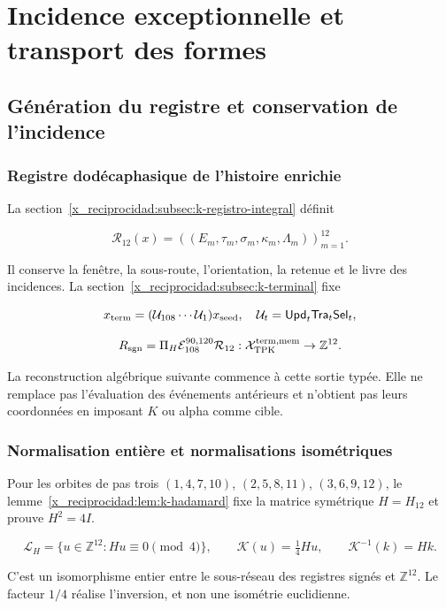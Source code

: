 \chapter{Incidence exceptionnelle et transport des formes}
\label{x_reciprocidad:nuclear:4}
\section{Génération du registre et conservation de l’incidence}

\subsection{Registre dodécaphasique de l’histoire enrichie}

La section~\ref{x_reciprocidad:subsec:k-registro-integral} définit

\[
\mathcal R_{12}(x)=((E_m,\tau_m,\sigma_m,\kappa_m,\Lambda_m))_{m=1}^{12}.
\]

Il conserve la fenêtre, la sous-route, l’orientation, la retenue et le livre des incidences. La section~\ref{x_reciprocidad:subsec:k-terminal} fixe

\[
x_{\rm term}=(\mathcal U_{108}\cdots\mathcal U_1)x_{\rm seed},
\quad \mathcal U_t=\mathsf{Upd}_t\mathsf{Tra}_t\mathsf{Sel}_t,
\]

\[
R_{\rm sgn}=\Pi_H\mathcal E_{108}^{90,120}\mathcal R_{12}:
\mathcal X_{\rm TPK}^{\rm term,mem}\to\mathbb Z^{12}.
\]

La reconstruction algébrique suivante commence à cette sortie typée. Elle ne remplace pas l’évaluation des événements antérieurs et n’obtient pas leurs coordonnées en imposant \(K\) ou alpha comme cible.

\subsection{Normalisation entière et normalisations isométriques}

Pour les orbites de pas trois \((1,4,7,10)\), \((2,5,8,11)\), \((3,6,9,12)\), le lemme~\ref{x_reciprocidad:lem:k-hadamard} fixe la matrice symétrique \(H=H_{12}\) et prouve \(H^2=4I\).

\[
\mathcal L_H=\{u\in\mathbb Z^{12}:Hu\equiv0\pmod4\},
\qquad \mathscr K(u)=\tfrac14Hu,
\qquad \mathscr K^{-1}(k)=Hk.
\]

C’est un isomorphisme entier entre le sous-réseau des registres signés et \(\mathbb Z^{12}\). Le facteur \(1/4\) réalise l’inversion, et non une isométrie euclidienne.

